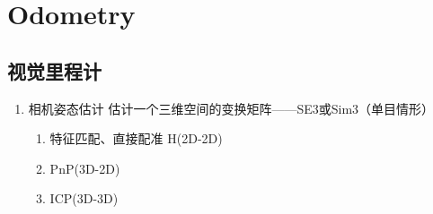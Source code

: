 \chapter{Odometry}

\section{视觉里程计}

\begin{enumerate}

\item 相机姿态估计 \newline
估计一个三维空间的变换矩阵——SE3或Sim3（单目情形）
\begin{enumerate}
\item 特征匹配、直接配准 H(2D-2D)
\item PnP(3D-2D)
\item ICP(3D-3D)
\end{enumerate}

\end{enumerate}